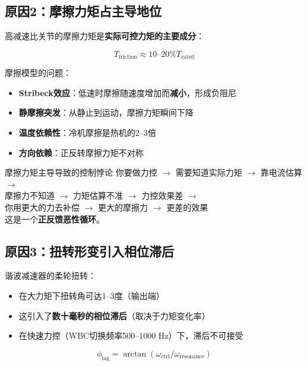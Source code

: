 \subsection{原因2：摩擦力矩占主导地位}

高减速比关节的摩擦力矩是\textbf{实际可控力矩的主要成分}：

\begin{equation}
T_{\text{friction}} \approx 10\text{--}20\% T_{\text{rated}}
\end{equation}

摩擦模型的问题：
\begin{itemize}
  \item \textbf{Stribeck效应}：低速时摩擦随速度增加而\textbf{减小}，形成负阻尼
  \item \textbf{静摩擦突发}：从静止到运动，摩擦力矩瞬间下降
  \item \textbf{温度依赖性}：冷机摩擦是热机的2--3倍
  \item \textbf{方向依赖}：正反转摩擦力矩不对称
\end{itemize}

\begin{cautionbox}{摩擦力矩主导导致的控制悖论}
你要做力控 $\rightarrow$ 需要知道实际力矩 $\rightarrow$ 靠电流估算 $\rightarrow$ \\摩擦力不知道 $\rightarrow$ 力矩估算不准 $\rightarrow$ 力控效果差 $\rightarrow$ \\你用更大的力去补偿 $\rightarrow$ 更大的摩擦力 $\rightarrow$ 更差的效果\\
这是一个\textbf{正反馈恶性循环}。
\end{cautionbox}

\subsection{原因3：扭转形变引入相位滞后}

谐波减速器的柔轮扭转：
\begin{itemize}
  \item 在大力矩下扭转角可达1--3度（输出端）
  \item 这引入了\textbf{数十毫秒的相位滞后}（取决于力矩变化率）
  \item 在快速力控（WBC切换频率500--1000 Hz）下，滞后不可接受
\end{itemize}

\begin{equation}
\phi_{\text{lag}} = \arctan(\omega_{\text{ctrl}} / \omega_{\text{resonance}})
\end{equation}

